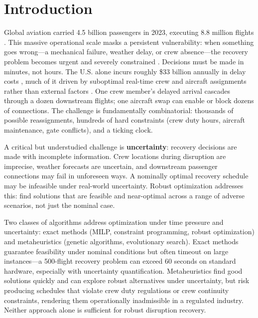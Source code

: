 \documentclass[12pt,number]{elsarticle}
\begin{document}

\section{Introduction}
\label{sec:introduction}

Global aviation carried 4.5 billion passengers in 2023, executing 8.8 million flights \cite{iata2024}. This massive operational scale masks a persistent vulnerability: when something goes wrong---a mechanical failure, weather delay, or crew absence---the recovery problem becomes urgent and severely constrained \cite{hu2024}. Decisions must be made in minutes, not hours. The U.S. alone incurs roughly \$33 billion annually in delay costs \cite{ball2010}, much of it driven by suboptimal real-time crew and aircraft assignments rather than external factors \cite{barnhart2004}. One crew member's delayed arrival cascades through a dozen downstream flights; one aircraft swap can enable or block dozens of connections. The challenge is fundamentally combinatorial: thousands of possible reassignments, hundreds of hard constraints (crew duty hours, aircraft maintenance, gate conflicts), and a ticking clock.

A critical but understudied challenge is \textbf{uncertainty}: recovery decisions are made with incomplete information. Crew locations during disruption are imprecise, weather forecasts are uncertain, and downstream passenger connections may fail in unforeseen ways. A nominally optimal recovery schedule may be infeasible under real-world uncertainty. Robust optimization addresses this: find solutions that are feasible and near-optimal across a range of adverse scenarios, not just the nominal case.

Two classes of algorithms address optimization under time pressure and uncertainty: exact methods (MILP, constraint programming, robust optimization) and metaheuristics (genetic algorithms, evolutionary search). Exact methods guarantee feasibility under nominal conditions but often timeout on large instances---a 500-flight recovery problem can exceed 60 seconds on standard hardware, especially with uncertainty quantification. Metaheuristics find good solutions quickly and can explore robust alternatives under uncertainty, but risk producing schedules that violate crew duty regulations or crew continuity constraints, rendering them operationally inadmissible in a regulated industry. Neither approach alone is sufficient for robust disruption recovery.
\end{document}
